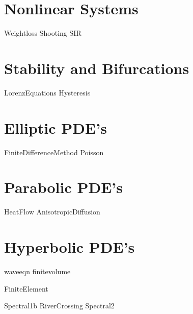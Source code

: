 \documentclass[nociteref]{SIAM-GH-book}
\begin{document}
\part{Nonlinear Systems}
{Weightloss}
{Shooting}
{SIR}


\part{Stability and Bifurcations}
{LorenzEquations}
{Hysteresis}

\part{Elliptic PDE's}
 {FiniteDifferenceMethod}
 {Poisson}

\part{Parabolic PDE's}
{HeatFlow}
{AnisotropicDiffusion}


\part{Hyperbolic PDE's}
{waveeqn}
{finitevolume}

{FiniteElement}

{Spectral1b}
{RiverCrossing}
{Spectral2}

% 
% 
% 
% 
% 
% 
\end{document}
